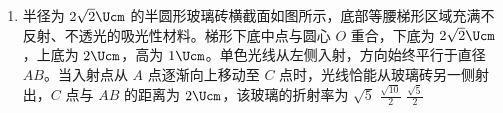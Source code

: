 \documentclass[\gkver]{gaokaozhenti}
\begin{document}
\begin{enumerate}
{海卫二绕海王星公转：设海卫二公转周期为 $T_{\text{卫}}$，轨道半长轴为 $r_{\text{卫}}$，海王星质量为 $M_{\text{海}}$，则

\[ \frac{GM_{\text{海}}m_{\text{卫}}}{r_{\text{卫}}^{2}} = m_{\text{卫}}\left(\frac{2\pi}{T_{\text{卫}}}\right)^{2}r_{\text{卫}} \]

已知 $T_{\text{卫}} \approx T_{\text{地}}$，且 $\frac{M_{\text{太}}}{M_{\text{海}}} = a$，则 $\frac{r_{\text{卫}}^{3}}{r_{\text{地}}^{3}} = \frac{M_{\text{海}}}{M_{\text{太}}} = \frac{1}{a}$

整理得 $r_{\text{卫}}^{3} = \frac{1}{a} \cdot (1\UAU)^{3}$

故 $r_{\text{卫}} = \frac{1}{\sqrt[3]{a}}\UAU$

故选 A。
}

\item
半径为 $2\sqrt{2}\Ucm$ 的半圆形玻璃砖横截面如图所示，底部等腰梯形区域充满不反射、不透光的吸光性材料。梯形下底中点与圆心 $O$ 重合，下底为 $2\sqrt{2}\Ucm$，上底为 $2\Ucm$，高为 $1\Ucm$。单色光线从左侧入射，方向始终平行于直径 $AB$。当入射点从 $A$ 点逐渐向上移动至 $C$ 点时，光线恰能从玻璃砖另一侧射出，$C$ 点与 $AB$ 的距离为 $2\Ucm$，该玻璃的折射率为 
\onepicture[w=6cm]{}
{$\sqrt{5}$}
{$\frac{\sqrt{10}}{2}$}
{$\frac{\sqrt{5}}{2}$}


\end{enumerate}
\end{document}
